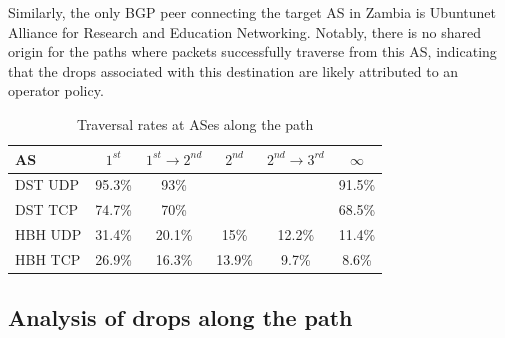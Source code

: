 \documentclass[conference]{IEEEtran}
\begin{document}

Similarly, the only BGP peer connecting the target AS in Zambia is Ubuntunet
Alliance for Research and Education Networking.  Notably, there is no shared
origin for the paths where packets successfully traverse from this AS,
indicating that the drops associated with this destination are likely
attributed to an operator policy.

\begin{table}
\centering
\caption{Traversal rates at ASes along the path}

\begin{tabular}{l|c|c|c|c|c}
   AS     & $1^{st}$  & $1^{st}\rightarrow 2^{nd}$   & $2^{nd}$  & $2^{nd} \rightarrow 3^{rd}$ &   $\infty$ \\ 
\hline \hline
DST UDP  & 95.3\%   & 93\%     &          &          & 91.5\%  \\
DST TCP  & 74.7\%   & 70\%     &          &          & 68.5\%  \\\hline
HBH UDP   & 31.4\%   & 20.1\%   & 15\%     & 12.2\%   & 11.4\%  \\ 
HBH TCP   & 26.9\%   & 16.3\%   & 13.9\%   & 9.7\%    & 8.6\%   \\ 
\end{tabular}
\label{tbl:uk_as1}

%
%
\end{table}


\subsection{Analysis of drops along the path}
\end{document}
